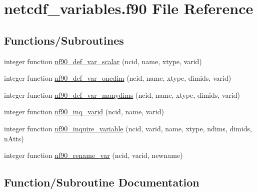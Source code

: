 \hypertarget{netcdf__variables_8f90}{}\section{netcdf\+\_\+variables.\+f90 File Reference}
\label{netcdf__variables_8f90}
\subsection*{Functions/\+Subroutines}
\begin{DoxyCompactItemize}
\item 
integer function \hyperlink{netcdf__variables_8f90_ab4e65fef4873720b23fc10d39d167def}{nf90\+\_\+def\+\_\+var\+\_\+scalar} (ncid, name, xtype, varid)
\item 
integer function \hyperlink{netcdf__variables_8f90_aa816d0c42f5189bd5b40c7131268666e}{nf90\+\_\+def\+\_\+var\+\_\+onedim} (ncid, name, xtype, dimids, varid)
\item 
integer function \hyperlink{netcdf__variables_8f90_afc120f4cac427809e58be68eed7e61c1}{nf90\+\_\+def\+\_\+var\+\_\+manydims} (ncid, name, xtype, dimids, varid)
\item 
integer function \hyperlink{netcdf__variables_8f90_ad13ff0a76f836cb953fb402637edca20}{nf90\+\_\+inq\+\_\+varid} (ncid, name, varid)
\item 
integer function \hyperlink{netcdf__variables_8f90_a06ba4f9a0cb129af462c8b2ff6c824a0}{nf90\+\_\+inquire\+\_\+variable} (ncid, varid, name, xtype, ndims, dimids, n\+Atts)
\item 
integer function \hyperlink{netcdf__variables_8f90_aa3779419b3894a821cca28e761077b2c}{nf90\+\_\+rename\+\_\+var} (ncid, varid, newname)
\end{DoxyCompactItemize}


\subsection{Function/\+Subroutine Documentation}
\mbox{\label{netcdf__variables_8f90_afc120f4cac427809e58be68eed7e61c1}} 
